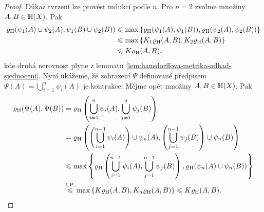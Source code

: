 \begin{proof}
    Důkaz tvrzení lze provést indukcí podle $n$. Pro $n=2$ zvolme množiny $A,B\in\mathbb{H}(X)$. Pak
    \begin{align*}
        \varrho_\textup{H}(\psi_1(A)\cup\psi_2(A),\psi_1(B)\cup\psi_2(B))&\leqslant\max\left\{\varrho_\textup{H}(\psi_1(A),\psi_1(B)),\varrho_\textup{H}(\psi_2(A),\psi_2(B))\right\}\\
        &\leqslant\max\left\{K_1\varrho_\textup{H}(A,B),K_2\varrho_\textup{H}(A,B)\right\}\\
        &\leqslant K\varrho_\textup{H}(A,B),
    \end{align*}
    kde druhá nerovnost plyne z lemmatu \ref{lem:hausdorffova-metrika-odhad-sjednoceni}. Nyní ukážeme, že zobrazení $\Psi$ definované předpisem $\Psi(A)=\bigcup_{i=1}^n\psi_i(A)$ je kontrakce. Mějme opět množiny $A,B\in\mathbb{H}(X)$. Pak
    \begin{align*}
        \varrho_\textup{H}(\Psi(A),\Psi(B))&=\varrho_\textup{H}\left(\bigcup_{i=1}^n\psi_i(A),\bigcup_{j=1}^n\psi_j(B)\right)\\
        &=\varrho_\textup{H}\left(\left(\bigcup_{i=1}^{n-1}\psi_i(A)\right)\cup\psi_n(A),\left(\bigcup_{j=1}^{n-1}\psi_j(B)\right)\cup\psi_n(B)\right)\\
        &\leqslant\max\left\{\varrho_\textup{H}\left(\bigcup_{i=1}^{n-1}\psi_i(A),\bigcup_{j=1}^{n-1}\psi_j(B)\right),\varrho_\textup{H}(\psi_n(A)\cup\psi_n(B))\right\}\\
        &\stackrel{\text{I.P.}}{\leqslant}\max\left\{K\varrho_\textup{H}(A,B),K_n\varrho_\textup{H}(A,B)\right\}\leqslant K\varrho_\textup{H}(A,B).
    \end{align*}
\end{proof}